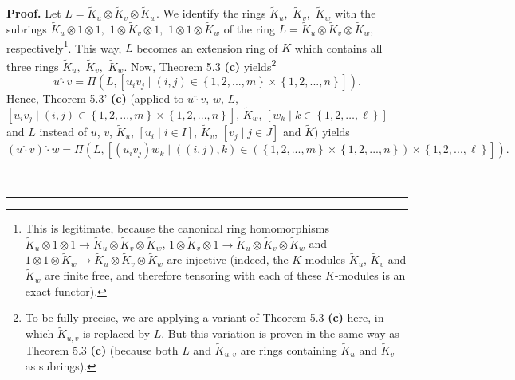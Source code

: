 \documentclass[numbers=enddot,12pt,final,onecolumn,notitlepage]{scrartcl}%
\newenvironment{proof}[1][Proof]{\noindent\textbf{#1.} }{\ \rule{0.5em}{0.5em}}
\begin{document}
\begin{proof}
Let $L=\widetilde{K}_{u}\otimes\widetilde{K}_{v}\otimes\widetilde{K}_{w}$. We
identify the rings $\widetilde{K}_{u},$ $\widetilde{K}_{v},$ $\widetilde{K}%
_{w}$ with the subrings $\widetilde{K}_{u}\otimes1\otimes1,$ $1\otimes
\widetilde{K}_{v}\otimes1,$ $1\otimes1\otimes\widetilde{K}_{w}$ of the ring
$L=\widetilde{K}_{u}\otimes\widetilde{K}_{v}\otimes\widetilde{K}_{w}$,
respectively\footnote{This is legitimate, because the canonical ring
homomorphisms $\widetilde{K}_{u}\otimes1\otimes1\rightarrow\widetilde{K}%
_{u}\otimes\widetilde{K}_{v}\otimes\widetilde{K}_{w}$, $1\otimes
\widetilde{K}_{v}\otimes1\rightarrow\widetilde{K}_{u}\otimes\widetilde{K}%
_{v}\otimes\widetilde{K}_{w}$ and $1\otimes1\otimes\widetilde{K}%
_{w}\rightarrow\widetilde{K}_{u}\otimes\widetilde{K}_{v}\otimes\widetilde{K}%
_{w}$ are injective (indeed, the $K$-modules $\widetilde{K}_{u}$,
$\widetilde{K}_{v}$ and $\widetilde{K}_{w}$ are finite free, and therefore
tensoring with each of these $K$-modules is an exact functor).}. This way, $L$
becomes an extension ring of $K$ which contains all three rings $\widetilde{K}%
_{u},$ $\widetilde{K}_{v},$ $\widetilde{K}_{w}$. Now, Theorem 5.3 \textbf{(c)}
yields\footnote{To be fully precise, we are applying a variant of Theorem 5.3
\textbf{(c)} here, in which $\widetilde{K}_{u,v}$ is replaced by $L$. But this
variation is proven in the same way as Theorem 5.3 \textbf{(c)} (because both
$L$ and $\widetilde{K}_{u,v}$ are rings containing $\widetilde{K}_{u}$ and
$\widetilde{K}_{v}$ as subrings).}%
\[
u\widehat{\cdot}v=\Pi\left(  L,\left[  u_{i}v_{j}\mid\left(  i,j\right)
\in\left\{  1,2,...,m\right\}  \times\left\{  1,2,...,n\right\}  \right]
\right)  .
\]
Hence, Theorem 5.3' \textbf{(c)} (applied to $u\widehat{\cdot}v$, $w$, $L$,
$\left[  u_{i}v_{j}\mid\left(  i,j\right)  \in\left\{  1,2,...,m\right\}
\times\left\{  1,2,...,n\right\}  \right]  $, $\widetilde{K}_{w}$, $\left[
w_{k}\mid k\in\left\{  1,2,\ldots,\ell\right\}  \right]  $ and $L$ instead of
$u$, $v$, $\widetilde{K}_{u}$, $\left[  u_{i}\mid i\in I\right]  $,
$\widetilde{K}_{v}$, $\left[  v_{j}\mid j\in J\right]  $ and $\widetilde{K}$)
yields
\[
\left(  u\widehat{\cdot}v\right)  \widehat{\cdot}w=\Pi\left(  L,\left[
\left(  u_{i}v_{j}\right)  w_{k}\mid\left(  \left(  i,j\right)  ,k\right)
\in\left(  \left\{  1,2,...,m\right\}  \times\left\{  1,2,...,n\right\}
\right)  \times\left\{  1,2,...,\ell\right\}  \right]  \right)  .
\]



\end{proof}
\end{document}
